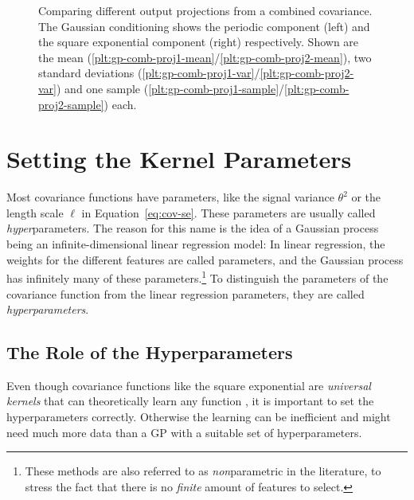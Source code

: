  \begin{figure}
  \setlength{}%
  \setlength\figureheight{0.618\figurewidth}%
  \caption[Comparing different output projections from a combined
covariance.]{Comparing different output projections from a combined
covariance. The Gaussian conditioning shows the periodic component (left) and
the square exponential component (right) respectively. Shown are the mean
(\ref*{plt:gp-comb-proj1-mean}/\ref*{plt:gp-comb-proj2-mean}), two
standard deviations (\ref*{plt:gp-comb-proj1-var}/\ref*{plt:gp-comb-proj2-var})
and one sample
(\ref*{plt:gp-comb-proj1-sample}/\ref*{plt:gp-comb-proj2-sample}) each.}
  \label{fig:different-output-projections}
\end{figure}

\vspace{-\baselineskip}
\section{Setting the Kernel Parameters}
\label{sec:parameter-fitting}

Most covariance functions have parameters, like the signal variance $\theta^2$
or the length scale $\ell$ in Equation~\eqref{eq:cov-se}. These parameters are
usually called \emph{hyper}para\-meters. The reason for this name is the idea
of a Gaussian process being an infinite-dimensional linear regression model: In
linear regression, the weights for the different features are called
parameters, and the Gaussian process has infinitely many of these
parameters.\footnote{These methods are also referred to as \emph{non}parametric
in the literature, to stress the fact that there is no \emph{finite} amount of
features to select.} To distinguish the parameters of the covariance function
from the linear regression parameters, they are called \emph{hyperparameters}.

\subsection{The Role of the Hyperparameters}

Even though covariance functions like the square exponential are
\emph{universal kernels} that can theoretically learn any function
\cite{Micchelli.Xu.ea:2006:Universal}, it is important to set the
hyperparameters correctly. Otherwise the learning can be inefficient and might
need much more data than a GP with a suitable set of
hyperparameters.~\cite{van-der-Vaart.van-Zanten:2011:Information}

